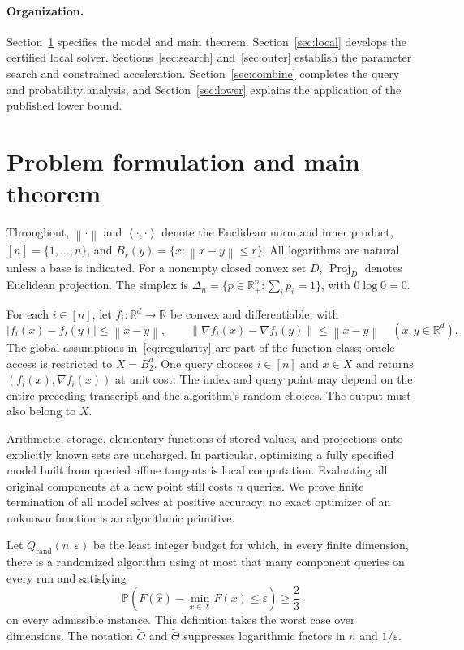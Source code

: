 \documentclass[11pt,a4paper]{article}
\theoremstyle{definition}\newtheorem{definition}[theorem]{Definition}
\theoremstyle{remark}\newtheorem{remark}[theorem]{Remark}
\newcommand{\R}{\mathbb R}
\newcommand{\Pp}{\mathbb P}
\newcommand{\eps}{\varepsilon}
\newcommand{\norm}[1]{\left\|#1\right\|}
\newcommand{\ip}[2]{\left\langle#1,#2\right\rangle}
\newcommand{\tO}{\widetilde O}
\newcommand{\tTheta}{\widetilde\Theta}
\newcommand{\Q}{Q_{\mathrm{rand}}}
\DeclareMathOperator{\proj}{Proj}
\begin{document}
\paragraph{Organization.}
Section~\ref{sec:model} specifies the model and main theorem.
Section~\ref{sec:local} develops the certified local solver.
Sections~\ref{sec:search} and~\ref{sec:outer} establish the parameter search
and constrained acceleration. Section~\ref{sec:combine} completes the
query and probability analysis, and Section~\ref{sec:lower} explains the
application of the published lower bound.

\section{Problem formulation and main theorem}\label{sec:model}
Throughout, $\norm{\cdot}$ and $\ip{\cdot}{\cdot}$ denote the Euclidean
norm and inner product, $[n]=\{1,\ldots,n\}$, and
$B_r(y)=\{x:\norm{x-y}\le r\}$. All logarithms are natural unless a base
is indicated. For a nonempty closed convex set $D$, $\proj_D$ denotes
Euclidean projection. The simplex is
$\Delta_n=\{p\in\R_+^n:\sum_i p_i=1\}$, with $0\log0=0$.

For each $i\in[n]$, let $f_i:\R^d\to\R$ be convex and differentiable,
with
\begin{equation}\label{eq:regularity}
 |f_i(x)-f_i(y)|\le\norm{x-y},\qquad
 \norm{\nabla f_i(x)-\nabla f_i(y)}\le\norm{x-y}
 \quad(x,y\in\R^d).
\end{equation}
The global assumptions in~\eqref{eq:regularity} are part of the function
class; oracle access is restricted to $X=B_2^d$. One query chooses
$i\in[n]$ and $x\in X$ and returns $(f_i(x),\nabla f_i(x))$ at unit cost.
The index and query point may depend on the entire preceding transcript
and the algorithm's random choices. The output must also belong to $X$.

Arithmetic, storage, elementary functions of stored values, and projections
onto explicitly known sets are uncharged. In particular, optimizing a
fully specified model built from queried affine tangents is local
computation. Evaluating all original components at a new point still
costs $n$ queries. We prove finite termination of all model solves at
positive accuracy; no exact optimizer of an unknown function is an
algorithmic primitive.

Let $\Q(n,\eps)$ be the least integer budget for which, in every finite
dimension, there is a randomized algorithm using at most that many
component queries on every run and satisfying
\[
 \Pp\!\left(F(\hat x)-\min_{x\in X}F(x)\le\eps\right)\ge\frac23
\]
on every admissible instance. This definition takes the worst case over
dimensions. The notation $\tO$ and $\tTheta$ suppresses logarithmic
factors in $n$ and $1/\eps$.
\end{document}
